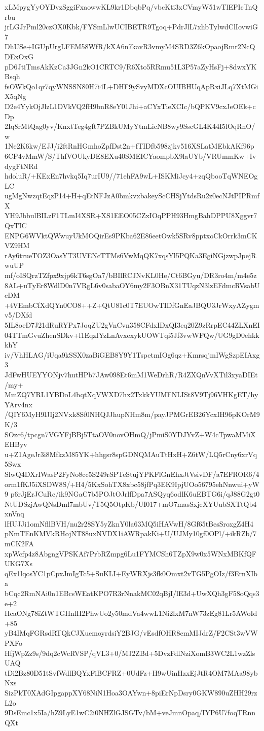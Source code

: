 xLMpygYyOYDvzSggiFxaowwKL9kr1DbqbPq/vbcKti3xCVmyW51wTlEPIcTnQrbu
jrLGJrPml20czOX0Kbk/FYSmLlwUCIBETR9Tgoq+PdrJlL7xhbTylwdClIovwiG7
DhUSe+IGUpUrgLFEM58WfR/kXA6n7kavR3vmyM4SRD3Z6kOpaojRmr2NcQDExOxG
pD6JtiTmsAkKzCa3JGn2kO1CRTC9/R6Xto5RRmu51L3P57aZyHsFj+8dwxYKBsqh
fsOWkQo1qr7qyWNSSN80H7i4L+DHF9ySvyMDXcOUIBHUqApRxiJLq7XtMGiX5qNg
D2e4YykOjJlzL1DVkVQ2fH9bnR8eY01Jhi+aCYxTieXCIc/bQPKV9cxJeOEk+cDp
2Iq8rMtQag0yv/KnxtTeg4gft7PZBkUMyYtmLicNB8wy9SscGL4K44I5lOqRnO/w
1Ne2K6kw/EJJ/i2ftRnHGmhoZpfDst2n+fTIDfb598zjkv516XSLatMEbkAKf96p
6CP4vMmW/S/ThfVOUkyDE8EXu40SMEICYaompbX9laUYb/VRUmmKw+IvdygFtNRd
hdoluR/+KExEn7hvkq5Iq7urIU9//71ehFA9wL+ISKMiJcy4+zqQbooTqWNEOgLC
ugMgNwzqtEqzP14+H+qEtNFJzA0bmkvxbakeyScCHSjYtdsRu2z0ecNJtPIPRmfX
YH9JbbulBILzF1TLmI4XSR+XS1EEO05CZxIOqPPH93HmgBahDPPU8Xggvr7QxTIC
ENPG6WVktQWwuyUkMOQirEs9PKba62E86eetOwk5SRv8pptxoCkOrrk3mCKVZ9HM
rAy6trueTOZ3OasYT3UVENcTTMs6VwMqQK7xqsYl5PQKa3EgiNGjzwpJpejRwuUP
mf/oISQrzTZfpx9xjp6kT6sgOa7/bBIlRCJNvKL0He/Ct6BGyu/DR3ro4m/m4e5z
8AL+uTyEr8WdlD0n7VRgL6v0sabaOY6my2F3OBnX31TUqzN3lzEFdmcRVsabUcDM
+tVEmbCfXdQYn0CO8++Z+QtU81c0T7EUOwTIDfGnEaJBQU3JrWxyAZygmv5/DXfd
5IL8oeD7J21dRuRYPx7JoqZU2gVnCvn358CFdxIDxQI3eq20Z9zRrpEC44ZLXnEI
04TTmGvuZhenSDkv+l1EqzIYzLnAvxexykUOWTqi5Jf3vwWFQw/UG9gD0ehkkkhY
iv/VhHLAG/iUqa9kSSX0zaBiGEB8Y9Y1TspetmIOg6qz+KmrsqjmIWgSzpEIAxg3
JdFwHUEYYONjv7hutHPb7JAw098Et6mM1WeDrhR/R4ZXQnVvXTil3xyaDIEt/my+
MmZQ7YRL1YBDoL4bqtXqVWXD7hx2TxkkYUMFNLISt8V9Tj96VHKgET/hyYArv4nx
/QIY6MyH9lJIj2NVxk8Sf0NHQJJhupNHm8m/payJPMGrEB26YcxIH96pKOrM9K/3
SOzc6/tpcgn7VGYFjBBj5TtaOV0novOHmQ/jPmiS0YDJYvZ+W4cTpwaMMiXEHByv
u+Z1AgeJr3i8MfkzM85YK+hhgsr8spGDNQMAuTtHxH+Z6tW/LQ5rCny6xrVq5Swx
SlwQ4DXrIWasP2FyNo8cc5S249rSPTeStujYPKFlGnEhxJtVsivDF/a7EFROR6/4
orm1fKJ5iXSDW8S/+H4/5KxSohTX8xbc58jfPq3EK9IpjUOo56795ehNnwui+yW9
p6rJjErJCuRc/ik9NGaC7b5POJtOJrlfDpa7ASQyq6odlK6uEBTG6i/qJ88G2gt0
NtUDSzjAwQNsDml7mbUv/T5Q5OtpKb/UI017+mO7masSxjeXYUubSXTtQb4xnVnq
lHUJJi1omNfllBVH/nu2r28SY5yZknY0la63MQ5iHAVwH/8Gf65tBesSroxgZ4H4
pNmTEnKMVkRHojNT88uxNVDX1iAWRpakKi+U/UJMy10gf0OPl/+ikRZb/7mCK2FA
xpWcfp4z8AbgngVPSKAf7PrbRZmpg6Lu1FYMCSh6TZpX9w0x5WNxMBKfQFUKG7Xs
qEx1lqosYC1pCpxJmIgTc5+SuKLI+EyWRXjs3fk0Omxt2vTG5PgOIz/f3ErnXIba
bCqc2RmNAi0n1EBcsWEatKPO7R3rNnakMC02qBjI/lE3d+UwXQh3gF58oQqs3e+2
HcaONg78iZtWTGHnlH2PhwUo2y50mdVa4wwL1Ni2lxM7nW73zEg81Lr5AWoId+85
yB4IMqFGRsdRTQkCJXuemoyrdsiY2BJG/vEsdfOHR8cmMIJdrZ/F2CSt3wVWPXFo
HfjWpZz9s/9dq2cWcRVSP/qVL3+0/MJ2ZBd+5DvzFdlNziXomB3WC2L1wzZlsUAQ
tDi2Bz80D51tSvfWdlBQYxFiBCFRZ+0UdFz+H9wUinHzxEjJtR4OM7MAa98ybNxs
SizPkT0XAdGIpgappXY68NiN1Hoa3OAYwn+8piErNpDsry0GKW890uZHH29rzL2o
9DsEmc1x5Ia/hZ9LyE1wC2i0NHZlGJSGTv/bM+veJmnOpaq/IYP6U7foqTRnnQXt
